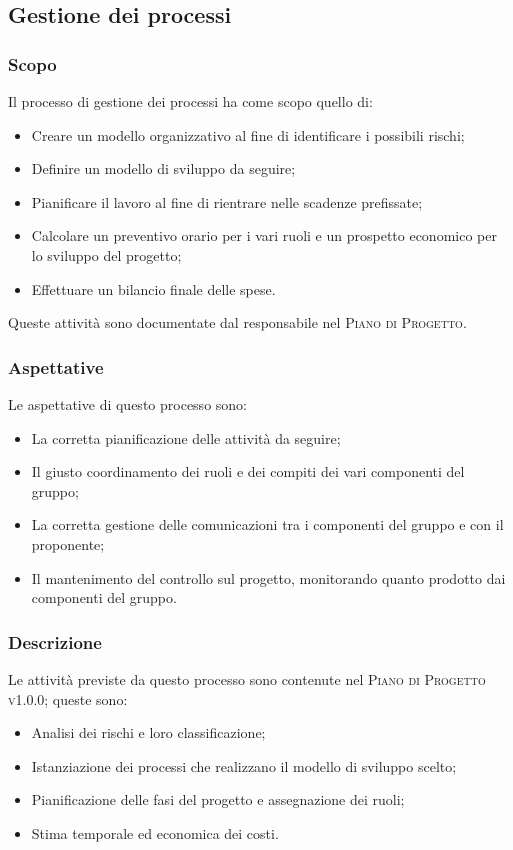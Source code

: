 \documentclass[../norme-di-progetto.tex]{subfiles}
\begin{document}
\subsection{Gestione dei processi}
\subsubsection{Scopo}
Il processo di gestione dei processi ha come scopo quello di:
\begin{itemize}
  \item Creare un modello organizzativo al fine di identificare i possibili rischi;
  \item Definire un modello di sviluppo da seguire;
  \item Pianificare il lavoro al fine di rientrare nelle scadenze prefissate;
  \item Calcolare un preventivo orario per i vari ruoli e un prospetto economico per lo sviluppo del progetto;
  \item Effettuare un bilancio finale delle spese.
\end{itemize}
Queste attività sono documentate dal responsabile nel \textsc{Piano di Progetto}.

\subsubsection{Aspettative}
Le aspettative di questo processo sono:
\begin{itemize}
  \item La corretta pianificazione delle attività da seguire;
  \item Il giusto coordinamento dei ruoli e dei compiti dei vari componenti del gruppo;
  \item La corretta gestione delle comunicazioni tra i componenti del gruppo e con il proponente;
  \item Il mantenimento del controllo sul progetto, monitorando quanto prodotto dai componenti del gruppo.
\end{itemize}

\subsubsection{Descrizione}
Le attività previste da questo processo sono contenute nel \textsc{Piano di Progetto v1.0.0}; queste sono:
\begin{itemize}
  \item Analisi dei rischi e loro classificazione;
  \item Istanziazione dei processi che realizzano il modello di sviluppo scelto;
  \item Pianificazione delle fasi del progetto e assegnazione dei ruoli;
  \item Stima temporale ed economica dei costi.
\end{itemize}
\end{document}
